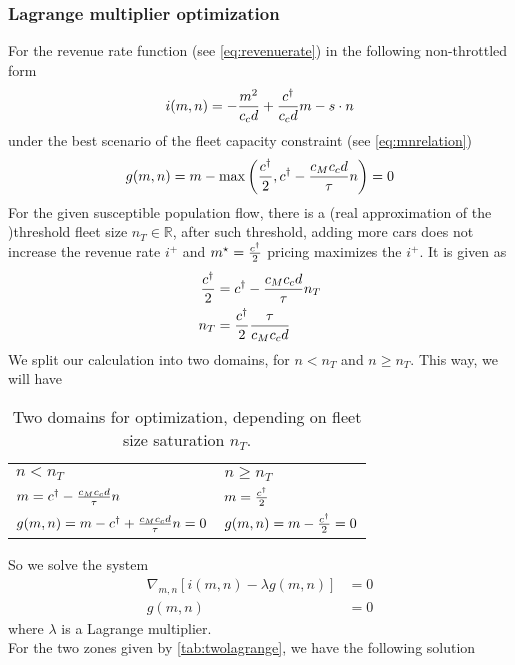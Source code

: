 \documentclass[a4paper]{report}
\begin{document}
\subsubsection{Lagrange multiplier optimization}
For the revenue rate function (see \autoref{eq:revenuerate}) in the following non-throttled form
\begin{equation}
	i(m,n)=-\frac{m^2}{c_cd}+\frac{c^{\dagger}}{c_cd}m-s\cdot n \label{eq:revenueratefree}
\end{equation}
under the best scenario of the fleet capacity constraint (see \autoref{eq:mnrelation})
\begin{equation}
	g(m,n)=m - \max\left(\frac{c^{\dagger}}{2},c^{\dagger}-\frac{c_Mc_cd}{\tau}n\right)=0 \label{eq:lagrangeconst}
\end{equation}
For the given susceptible population flow, there is a (real approximation of the )threshold fleet size $n_T\in \mathbb{R}$, after such threshold, adding more cars does not increase the revenue rate $i^{+}$ and $m^{\star}=\frac{c^{\dagger}}{2}$ pricing maximizes the $i^{+}$. It is given as
\begin{align}
	\frac{c^{\dagger}}{2}&=c^{\dagger}-\frac{c_Mc_cd}{\tau} n_T \nonumber\\
	n_T&=\frac{c^{\dagger}}{2}\frac{\tau}{c_Mc_cd} \label{eq:threshn}
\end{align}
We split our calculation into two domains, for $n<n_T$ and $n\geq n_T$. This way, we will have\\

\begin{table}[ht]
	\centering
	\begin{tabular}{p{}| p{}}
		$n < n_T$					& $n \geq n_T$ \\
		$m = c^{\dagger} - \frac{c_Mc_cd}{\tau} n$			& $m = \frac{c^{\dagger}}{2}$ \\
		$g(m,n)= m - c^{\dagger} + \frac{c_Mc_cd}{\tau} n = 0$	& $g(m,n) = m - \frac{c^{\dagger}}{2} = 0$\\ 
	\end{tabular}
	\caption{Two domains for optimization, depending on fleet size saturation $n_T$.}
	\label{tab:twolagrange}
\end{table}

So we solve the system
\begin{align*}
	\nabla_{m,n} \left[i(m,n)-\lambda g(m,n)\right]&=0\\
	g(m,n)&=0
\end{align*}
where $\lambda$ is a Lagrange multiplier.\\

For the two zones given by \autoref{tab:twolagrange}, we have the following solution
\end{document}
